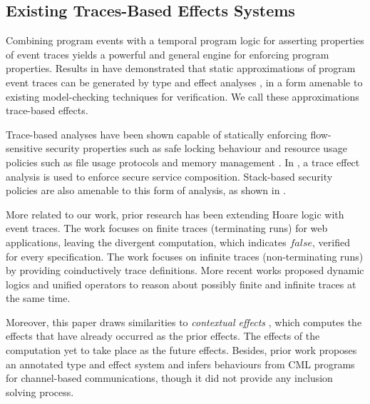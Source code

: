 \documentclass[acmsmall,10pt,review]{acmart}
\newcommand{\code}[1]{{\tt{\ensuremath{\m{#1}}}}}
\newcommand{\m}{\mathit}
\begin{document}
{\subsection{Existing Traces-Based Effects Systems} 



Combining program events with a temporal program logic for asserting properties of event traces yields a powerful and general engine for enforcing program properties. Results in \cite{skalka2008types,skalka2004history,marriott2003resource} have demonstrated that static approximations of program event traces can be generated by type and effect analyses \cite{talpin1994type,amtoft1999type}, in a form amenable to existing model-checking techniques for verification. We call these approximations trace-based effects.

Trace-based analyses have been shown capable of statically enforcing flow-sensitive security properties such as safe locking behaviour \cite{foster2002flow} and resource usage policies such as file usage protocols and memory management \cite{marriott2003resource}. In \cite{bartoletti2005enforcing}, a trace effect analysis is used to enforce secure service composition. 
 Stack-based security policies are also amenable to this form of analysis, as shown in \cite{skalka2004history}. 
 

 

 
More related to our work, prior research has been extending Hoare logic with event traces. The work \cite{malecha2011trace} focuses on finite traces (terminating runs) for web applications, leaving the divergent computation, which indicates \code{false}, verified for every specification. The work \cite{nakata2010hoare} focuses on infinite traces (non-terminating runs) by providing coinductively trace definitions. 
More recent works \cite{bubel2015dynamic,song2020automated} proposed dynamic logics and unified operators to reason about possibly finite and infinite traces at the same time. 

Moreover, this paper draws similarities to \textit{contextual effects} \cite{neamtiu2008contextual}, which computes the effects that have already occurred as the prior effects. The effects of the computation yet to take place as the future effects. 
Besides, prior work \cite{nielson1998behaviour} proposes an annotated type and effect system and infers behaviours from CML \cite{reppy1993concurrent} programs for channel-based communications, though it did not provide any inclusion solving process. 



}
\end{document}
